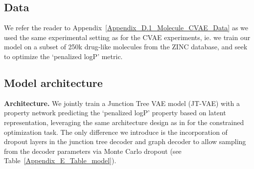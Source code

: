 \subsection{Data}
\label{Appendix_E.1_Molecule_JTVAE_Data}
We refer the reader to Appendix~\ref{Appendix_D.1_Molecule_CVAE_Data} as we used the same experimental setting as for the CVAE experiments, ie. we train our model on a subset of 250k drug-like molecules from the ZINC database, and seek to optimize the `penalized logP' metric.

\subsection{Model architecture}
\label{Appendix_E.2_Molecule_JTVAE_Model}

\textbf{Architecture.} We jointly train a Junction Tree VAE model (JT-VAE) with a property network predicting the `penalized logP' property based on latent representation, leveraging the same architecture design as in \citet{jin2019junction} for the constrained optimization task. The only difference we introduce is the incorporation of dropout layers in the junction tree decoder and graph decoder to allow sampling from the decoder parameters via Monte Carlo dropout (see Table~\ref{Appendix_E_Table_model}).

\begin{table}[h]
\begin{center}
\caption{\textbf{Molecular generation with JT-VAE - Model architecture details.} All components are identical to the JT-VAE architecture used for constrained optimization from \citet{jin2019junction}, except for the dropout layers detailed below}
\label{Appendix_E_Table_model}
\end{center}
\end{table}

